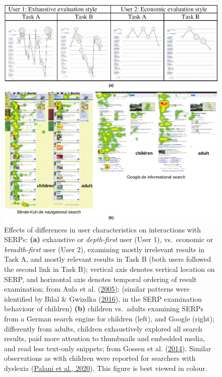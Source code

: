 \documentclass[letterpaper, nobind]{templates/ociamthesis}
\begin{document}
\begin{figure}

{\centering \includegraphics[width=1\linewidth]{figs/res-L-serp-user-chars} 

}

\caption[Differences in user characteristics on interactions with SERPs.]{Effects of differences in user characteristics on interactions with SERPs: \textbf{(a)} exhaustive or \emph{depth-first} user (User 1), vs.~economic or \emph{breadth-first} user (User 2), examining mostly irrelevant results in Task A, and mostly relevant results in Task B (both users followed the second link in Task B); vertical axis denotes vertical location on SERP, and horizontal axis denotes temporal ordering of result examination; from Aula et al. (\protect\hyperlink{ref-102}{2005}); (similar patterns were identified by Bilal \& Gwizdka (\protect\hyperlink{ref-139}{2016}), in the SERP examination behaviour of children) \textbf{(b)} children vs.~adults examining SERPs from a German search engine for children (left), and Google (right); differently from adults, children exhaustively explored all search results, paid more attention to thumbnails and embedded media, and read less text-only snippets; from Gossen et al. (\protect\hyperlink{ref-124}{2014}). Similar observations as with children were reported for searchers with dyslexia (\protect\hyperlink{ref-palani2020eye}{Palani et al., 2020}). This figure is best viewed in colour.}\label{fig:res-L-serp-user-chars}
\end{figure}
\end{document}
